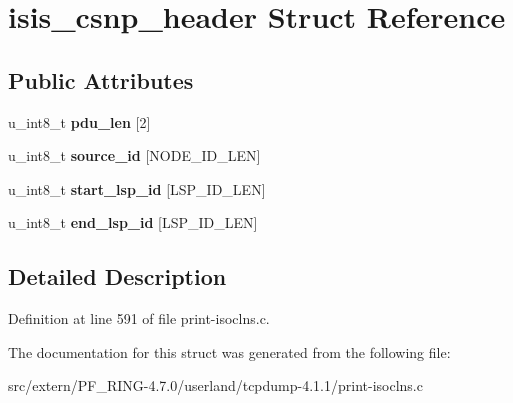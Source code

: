 \hypertarget{structisis__csnp__header}{
\section{isis\_\-csnp\_\-header Struct Reference}
\label{structisis__csnp__header}
}
\subsection*{Public Attributes}
\begin{DoxyCompactItemize}
\item 
\hypertarget{structisis__csnp__header_a23da8ef07d380c279d0c6ac89c454c41}{
u\_\-int8\_\-t {\bfseries pdu\_\-len} \mbox{[}2\mbox{]}}
\label{structisis__csnp__header_a23da8ef07d380c279d0c6ac89c454c41}

\item 
\hypertarget{structisis__csnp__header_a9401eb80dbeccac96bc081e2e7a2fd74}{
u\_\-int8\_\-t {\bfseries source\_\-id} \mbox{[}NODE\_\-ID\_\-LEN\mbox{]}}
\label{structisis__csnp__header_a9401eb80dbeccac96bc081e2e7a2fd74}

\item 
\hypertarget{structisis__csnp__header_adc10815f16ac48eb9ea449dddb0702bb}{
u\_\-int8\_\-t {\bfseries start\_\-lsp\_\-id} \mbox{[}LSP\_\-ID\_\-LEN\mbox{]}}
\label{structisis__csnp__header_adc10815f16ac48eb9ea449dddb0702bb}

\item 
\hypertarget{structisis__csnp__header_ac0c0a983d61be49face98f6e27a479b8}{
u\_\-int8\_\-t {\bfseries end\_\-lsp\_\-id} \mbox{[}LSP\_\-ID\_\-LEN\mbox{]}}
\label{structisis__csnp__header_ac0c0a983d61be49face98f6e27a479b8}

\end{DoxyCompactItemize}


\subsection{Detailed Description}


Definition at line 591 of file print-\/isoclns.c.



The documentation for this struct was generated from the following file:\begin{DoxyCompactItemize}
\item 
src/extern/PF\_\-RING-\/4.7.0/userland/tcpdump-\/4.1.1/print-\/isoclns.c\end{DoxyCompactItemize}
